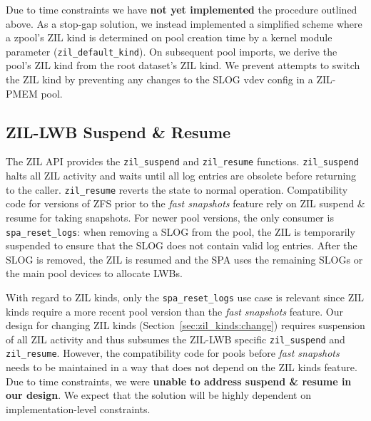 \documentclass[12pt,a4paper,twoside]{book}
\begin{document}
Due to time constraints we have \textbf{not yet implemented} the procedure outlined above.
As a stop-gap solution, we instead implemented a simplified scheme where a zpool's ZIL kind is determined on pool creation time by a kernel module parameter (\lstinline{zil_default_kind}).
On subsequent pool imports, we derive the pool's ZIL kind from the root dataset's ZIL kind.
We prevent attempts to switch the ZIL kind by preventing any changes to the SLOG vdev config in a ZIL-PMEM pool.


\subsection{ZIL-LWB Suspend \& Resume}\label{sec:zil_kinds:suspend_resume}
The ZIL API provides the \lstinline{zil_suspend} and \lstinline{zil_resume} functions.
\lstinline{zil_suspend} halts all ZIL activity and waits until all log entries are obsolete before returning to the caller.
\lstinline{zil_resume} reverts the state to normal operation.
Compatibility code for versions of ZFS prior to the \textit{fast snapshots} feature rely on ZIL suspend \& resume for taking snapshots.
For newer pool versions, the only consumer is \lstinline{spa_reset_logs}: when removing a SLOG from the pool, the ZIL is temporarily suspended to ensure that the SLOG does not contain valid log entries.
After the SLOG is removed, the ZIL is resumed and the SPA uses the remaining SLOGs or the main pool devices to allocate LWBs.

With regard to ZIL kinds, only the \lstinline{spa_reset_logs} use case is relevant since ZIL kinds require a more recent pool version than the \textit{fast snapshots} feature.
Our design for changing ZIL kinds (Section~\ref{sec:zil_kinds:change}) requires suspension of all ZIL activity and thus subsumes the ZIL-LWB specific \lstinline{zil_suspend} and \lstinline{zil_resume}.
However, the compatibility code for pools before \textit{fast snapshots} needs to be maintained in a way that does not depend on the ZIL kinds feature.
Due to time constraints, we were \textbf{unable to address suspend \& resume in our design}.
We expect that the solution will be highly dependent on implementation-level constraints.
\end{document}
